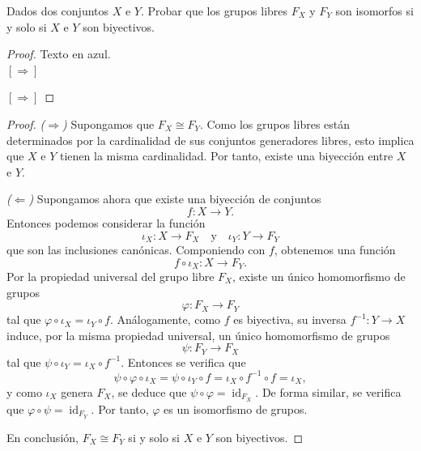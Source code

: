 \begin{ejercicio}
	Dados dos conjuntos $X$ e $Y$. Probar que los grupos libres $F_X$ y $F_Y$ son isomorfos si y solo si $X$ e $Y$ son biyectivos.
\end{ejercicio}
\begin{proof}
	{\color{white} Texto en azul.}\\
	
	\noindent $[\Rightarrow]$
	
	\noindent   $[\Rightarrow]$
\end{proof}
\begin{ejercicio}
\end{ejercicio}




\begin{proof}
	\noindent\emph{($\Rightarrow$)}  Supongamos que \(F_X \cong F_Y\). Como los grupos libres están determinados por la cardinalidad de sus conjuntos generadores libres, esto implica que \(X\) e \(Y\) tienen la misma cardinalidad. Por tanto, existe una biyección entre \(X\) e \(Y\).
	
	\vspace{1ex}
	\noindent\emph{($\Leftarrow$)} Supongamos ahora que existe una biyección de conjuntos
	\[
	f: X \to Y.
	\]
	Entonces podemos considerar la función
	\[
	\iota_X : X \longrightarrow F_X
	\quad \text{y} \quad
	\iota_Y : Y \longrightarrow F_Y
	\]
	que son las inclusiones canónicas. Componiendo con \(f\), obtenemos una función
	\[
	f \circ \iota_X : X \to F_Y.
	\]
	Por la propiedad universal del grupo libre \(F_X\), existe un único homomorfismo de grupos
	\[
	\varphi : F_X \to F_Y
	\]
	tal que \(\varphi \circ \iota_X = \iota_Y \circ f\). Análogamente, como \(f\) es biyectiva, su inversa \(f^{-1} : Y \to X\) induce, por la misma propiedad universal, un único homomorfismo de grupos
	\[
	\psi : F_Y \to F_X
	\]
	tal que \(\psi \circ \iota_Y = \iota_X \circ f^{-1}\). Entonces se verifica que
	\[
	\psi \circ \varphi \circ \iota_X = \psi \circ \iota_Y \circ f = \iota_X \circ f^{-1} \circ f = \iota_X,
	\]
	y como \(\iota_X\) genera \(F_X\), se deduce que \(\psi \circ \varphi = \operatorname{id}_{F_X}\). De forma similar, se verifica que \(\varphi \circ \psi = \operatorname{id}_{F_Y}\). Por tanto, \(\varphi\) es un isomorfismo de grupos.
	
	\vspace{1ex}
	\noindent En conclusión, \(F_X \cong F_Y\) si y solo si \(X\) e \(Y\) son biyectivos.
\end{proof}


